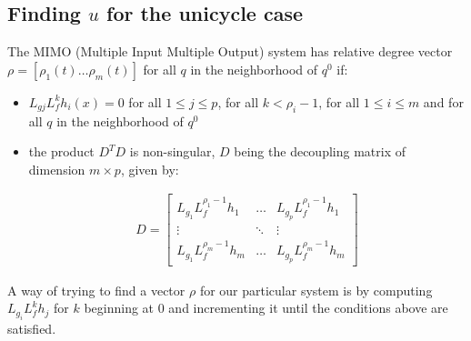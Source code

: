 \documentclass[letterpaper, 10 pt, conference]{ieeeconf}  %
\begin{document}

\subsection{Finding $u$ for the unicycle case}

The MIMO (Multiple Input Multiple Output) system has relative degree vector $\rho = [\rho_1(t) \dots \rho_m(t)]$ for all $q$ in the neighborhood of $q^0$ if:

\begin{itemize}
\item $L_{gj}L_f^kh_i(x) = 0$ for all $1 \leq j \leq p$, for all $k < \rho_i-1$, for all $1 \leq i \leq m$ and for all $q$ in the neighborhood of $q^0$
\item the product $D^TD$ is non-singular, $D$ being the decoupling matrix of dimension $m \times p$, given by:

\begin{eqnarray}
D = 
\left[\begin{array}{ccc}
L_{g_1}L_f^{\rho_1-1}h_1 & \dots & L_{g_p}L_f^{\rho_1-1}h_1\\
\vdots & \ddots & \vdots\\
L_{g_1}L_f^{\rho_m-1}h_m & \dots & L_{g_p}L_f^{\rho_m-1}h_m
\end{array}\right]
\end{eqnarray}
\end{itemize}

A way of trying to find a vector $\rho$ for our particular system is by computing $L_{g_i}L_f^kh_j$ for $k$ beginning at $0$ and incrementing it until the conditions above are satisfied.
\end{document}
